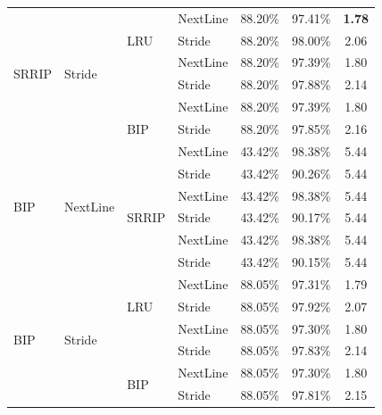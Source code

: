 \begin{longtable}{llllccc}
\multirow{6}{*}{SRRIP} & \multirow{6}{*}{Stride} & \multirow{3}{*}{LRU} & NextLine & 88.20\% & 97.41\% & \textbf{1.78} \\
 & & & Stride & 88.20\% & 98.00\% & 2.06 \\
 & & \multirow{3}{*}{SRRIP} & NextLine & 88.20\% & 97.39\% & 1.80 \\
 & & & Stride & 88.20\% & 97.88\% & 2.14 \\
 & & \multirow{3}{*}{BIP} & NextLine & 88.20\% & 97.39\% & 1.80 \\
 & & & Stride & 88.20\% & 97.85\% & 2.16 \\ \midrule

\multirow{6}{*}{BIP} & \multirow{6}{*}{NextLine} & \multirow{3}{*}{LRU} & NextLine & 43.42\% & 98.38\% & 5.44 \\
 & & & Stride & 43.42\% & 90.26\% & 5.44 \\
 & & \multirow{3}{*}{SRRIP} & NextLine & 43.42\% & 98.38\% & 5.44 \\
 & & & Stride & 43.42\% & 90.17\% & 5.44 \\
 & & \multirow{3}{*}{BIP} & NextLine & 43.42\% & 98.38\% & 5.44 \\
 & & & Stride & 43.42\% & 90.15\% & 5.44 \\ \midrule

\multirow{6}{*}{BIP} & \multirow{6}{*}{Stride} & \multirow{3}{*}{LRU} & NextLine & 88.05\% & 97.31\% & 1.79 \\
 & & & Stride & 88.05\% & 97.92\% & 2.07 \\
 & & \multirow{3}{*}{SRRIP} & NextLine & 88.05\% & 97.30\% & 1.80 \\
 & & & Stride & 88.05\% & 97.83\% & 2.14 \\
 & & \multirow{3}{*}{BIP} & NextLine & 88.05\% & 97.30\% & 1.80 \\
 & & & Stride & 88.05\% & 97.81\% & 2.15 \\
\end{longtable}
\normalsize